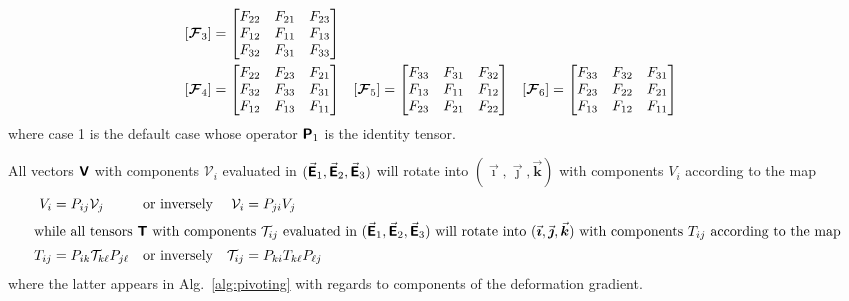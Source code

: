 \begin{subequations}
\begin{align}
    [ \boldsymbol{\mathcal{F}}_3 ] & = \begin{bmatrix}
    F_{22} & F_{21} & F_{23}\\
    F_{12} & F_{11} & F_{13}\\
    F_{32} & F_{31} & F_{33}
    \end{bmatrix} \notag \\
    [ \boldsymbol{\mathcal{F}}_4 ] & = \begin{bmatrix}
    F_{22} & F_{23} & F_{21}\\
    F_{32} & F_{33} & F_{31}\\
    F_{12} & F_{13} & F_{11}
    \end{bmatrix} &
    [ \boldsymbol{\mathcal{F}}_5 ] & = \begin{bmatrix}
    F_{33} & F_{31} & F_{32}\\
    F_{13} & F_{11} & F_{12}\\
    F_{23} & F_{21} & F_{22}
    \end{bmatrix} & 
    [ \boldsymbol{\mathcal{F}}_6 ] & = \begin{bmatrix}
    F_{33} & F_{32} & F_{31}\\
    F_{23} & F_{22} & F_{21}\\
    F_{13} & F_{12} & F_{11}
    \end{bmatrix}
    \end{align}
\end{subequations}
where case 1 is the default case whose operator $\boldsymbol{\mathsf{P}}_1$ is the identity tensor.

All vectors $\boldsymbol{\mathsf{V}}$ with components $\mathcal{V}_i$ evaluated in $( \vec{\boldsymbol{\mathsf{E}}}_1 , \vec{\boldsymbol{\mathsf{E}}}_2 , \vec{\boldsymbol{\mathsf{E}}}_3 )$ will rotate into $( \vec{\boldsymbol{\imath}} , \vec{\boldsymbol{\jmath}} , \vec{\boldsymbol{k}} )$ with components $V_i$ according to the map
\begin{subequations}
    \begin{align}
    V_i & = P_{ij} \mathcal{V}_j & \text{or inversely} & &
    \mathcal{V}_i & = P_{ji} V_j \\
    \intertext{while all tensors $\boldsymbol{\mathsf{T}}$ with components $\mathcal{T}_{ij}$ evaluated in $( \vec{\boldsymbol{\mathsf{E}}}_1 , \vec{\boldsymbol{\mathsf{E}}}_2 , \vec{\boldsymbol{\mathsf{E}}}_3 )$ will rotate into $( \vec{\boldsymbol{\imath}} , \vec{\boldsymbol{\jmath}} , \vec{\boldsymbol{k}} )$ with components $T_{ij}$ according to the map}
    T_{ij} & = P_{ik} \mathcal{T}_{k\ell} P_{j\ell} & \text{or inversely} & &
    \mathcal{T}_{ij} & = P_{ki} T_{k\ell} P_{\ell j}
    \end{align}
\end{subequations}
where the latter appears in Alg.~\ref{alg:pivoting} with regards to components of the deformation gradient.

